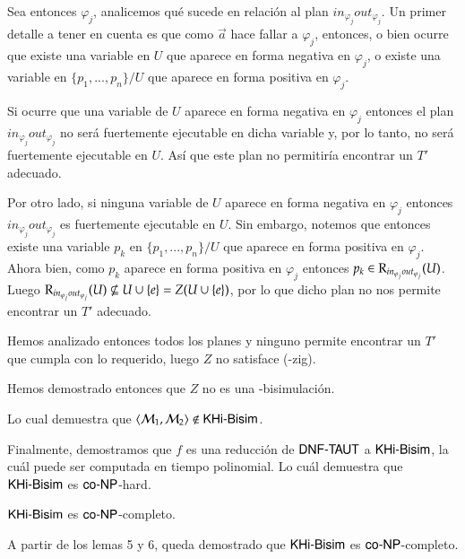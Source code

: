 \begin{demostracion}
\begin{itemize}
    Sea entonces $\varphi_j$, analicemos qué sucede en relación al plan $in_{\varphi_j}out_{\varphi_j}$. 
    Un primer detalle a tener en cuenta es que como $\overrightarrow{a}$ hace fallar a $\varphi_j$, entonces, 
    o bien ocurre que existe una variable en $U$ que aparece en forma negativa en $\varphi_j$, 
    o existe una variable en $\{p_1,...,p_n\}/U$ que aparece en forma positiva en $\varphi_j$.

    Si ocurre que una variable de $U$ aparece en forma negativa en $\varphi_j$ entonces el plan 
    $in_{\varphi_j}out_{\varphi_j}$ no será fuertemente ejecutable en dicha variable y, por lo tanto, 
    no será fuertemente ejecutable en $U$. Así que este plan no permitiría encontrar un $T'$ adecuado.

    Por otro lado, si ninguna variable de $U$ aparece en forma negativa en $\varphi_j$ entonces 
    $in_{\varphi_j}out_{\varphi_j}$ es fuertemente ejecutable en $U$. Sin embargo, notemos que 
    entonces existe una variable $p_k$ en $\{p_1,...,p_n\}/U$ que aparece en forma positiva en $\varphi_j$. 
    Ahora bien, como $p_k$ aparece en forma positiva en $\varphi_j$ entonces $p_k \in \mathrm{R}_{in_{\varphi_j}out_{\varphi_j}}(U)$. 
    Luego $\mathrm{R}_{in_{\varphi_j}out_{\varphi_j}}(U) \not \subseteq U \cup \{e\} = Z(U \cup \{e\})$, por lo que dicho plan no nos 
    permite encontrar un $T'$ adecuado.
    
    Hemos analizado entonces todos los planes y ninguno permite encontrar un $T'$ que cumpla con lo requerido, 
    luego $Z$ no satisface (\KHilogic-zig).

    Hemos demostrado entonces que $Z$ no es una \KHilogic-bisimulación.

    Lo cual demuestra que $\langle \mathcal{M}_1,\mathcal{M}_2 \rangle \not \in \rm\textsf{KHi-Bisim}$.
    \end{itemize}

    Finalmente, demostramos que $f$ es una reducción de $\rm\textsf{DNF-TAUT}$ a $\rm\textsf{KHi-Bisim}$, la cuál puede ser computada en tiempo polinomial. 
    Lo cuál demuestra que $\rm\textsf{KHi-Bisim}$ es $\rm\textsf{co-NP}$-hard.

\end{demostracion}


\begin{teorema}
    $\rm\textsf{KHi-Bisim}$ es $\rm\textsf{co-NP}$-completo.
\end{teorema}


\begin{demostracion}

    A partir de los lemas 5 y 6, queda demostrado que $\rm\textsf{KHi-Bisim}$ es $\rm\textsf{co-NP}$-completo.

\end{demostracion}

